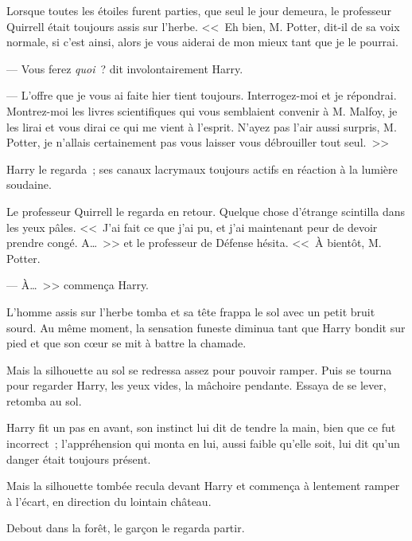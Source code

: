 Lorsque toutes les étoiles furent parties, que seul le jour demeura, le professeur Quirrell était toujours assis sur l'herbe. <<~Eh bien, M. Potter, dit-il de sa voix normale, si c'est ainsi, alors je vous aiderai de mon mieux tant que je le pourrai.

--- Vous ferez \emph{quoi}~? dit involontairement Harry.

--- L'offre que je vous ai faite hier tient toujours. Interrogez-moi et je répondrai. Montrez-moi les livres scientifiques qui vous semblaient convenir à M. Malfoy, je les lirai et vous dirai ce qui me vient à l'esprit. N'ayez pas l'air aussi surpris, M. Potter, je n'allais certainement pas vous laisser vous débrouiller tout seul.~>>

Harry le regarda~; ses canaux lacrymaux toujours actifs en réaction à la lumière soudaine.

Le professeur Quirrell le regarda en retour. Quelque chose d'étrange scintilla dans les yeux pâles. <<~J'ai fait ce que j'ai pu, et j'ai maintenant peur de devoir prendre congé. A…~>> et le professeur de Défense hésita. <<~À bientôt, M. Potter.

--- À…~>> commença Harry.

L'homme assis sur l'herbe tomba et sa tête frappa le sol avec un petit bruit sourd. Au même moment, la sensation funeste diminua tant que Harry bondit sur pied et que son cœur se mit à battre la chamade.

Mais la silhouette au sol se redressa assez pour pouvoir ramper. Puis se tourna pour regarder Harry, les yeux vides, la mâchoire pendante. Essaya de se lever, retomba au sol.

Harry fit un pas en avant, son instinct lui dit de tendre la main, bien que ce fut incorrect~; l'appréhension qui monta en lui, aussi faible qu'elle soit, lui dit qu'un danger était toujours présent.

Mais la silhouette tombée recula devant Harry et commença à lentement ramper à l'écart, en direction du lointain château.

Debout dans la forêt, le garçon le regarda partir.
